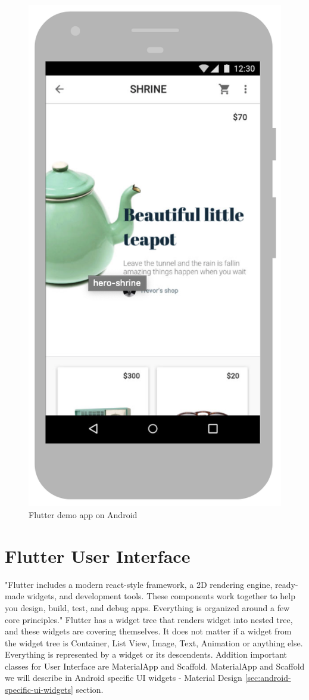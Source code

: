 \begin{figure}
\begin{minipage}{.45\textwidth}
        \centering
        \includegraphics[width=.7\linewidth]{assets/hero-shrine-android.png}
        \caption{Flutter demo app on Android \cite{flutterTechnicalOverview}}
        \label{fig:flutter-demo-app-android}
    \end{minipage}
    \label{fig:flutter-demo-app}
\end{figure}


\section{Flutter User Interface}\label{subsec:flutter-ui}
"Flutter includes a modern react-style framework, a 2D rendering engine, ready-made widgets, and development tools.
These components work together to help you design, build, test, and debug apps.
Everything is organized around a few core principles."\cite{flutterTechnicalOverview}
Flutter has a widget tree that renders widget into nested tree, and these widgets are covering themselves.
It does not matter if a widget from the widget tree is Container, List View, Image, Text, Animation or anything else.
Everything is represented by a widget or its descendents.
Addition important classes for User Interface are MaterialApp and Scaffold.
MaterialApp and Scaffold we will describe in Android specific UI widgets - Material Design \ref{sec:android-specific-ui-widgets} section.


